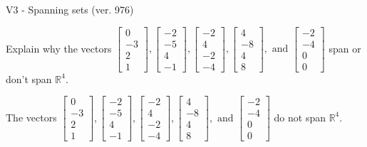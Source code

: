 \begin{exercise}
  \begin{exerciseTitle}V3 - Spanning sets (ver. 976)\end{exerciseTitle}
  \begin{exerciseStatement}
    Explain why the vectors \(\left[\begin{array}{r}
0 \\
-3 \\
2 \\
1
\end{array}\right] , \left[\begin{array}{r}
-2 \\
-5 \\
4 \\
-1
\end{array}\right] , \left[\begin{array}{r}
-2 \\
4 \\
-2 \\
-4
\end{array}\right] , \left[\begin{array}{r}
4 \\
-8 \\
4 \\
8
\end{array}\right] , \text{ and } \left[\begin{array}{r}
-2 \\
-4 \\
0 \\
0
\end{array}\right]\) span or don't span \(\mathbb{R}^4\). 
	


  \end{exerciseStatement}
  \begin{exerciseAnswer}
   The vectors \(\left[\begin{array}{r}
0 \\
-3 \\
2 \\
1
\end{array}\right] , \left[\begin{array}{r}
-2 \\
-5 \\
4 \\
-1
\end{array}\right] , \left[\begin{array}{r}
-2 \\
4 \\
-2 \\
-4
\end{array}\right] , \left[\begin{array}{r}
4 \\
-8 \\
4 \\
8
\end{array}\right] , \text{ and } \left[\begin{array}{r}
-2 \\
-4 \\
0 \\
0
\end{array}\right]\) 
  	 do not  
	span \(\mathbb{R}^4\).
  



\end{exerciseAnswer}
\end{exercise}
